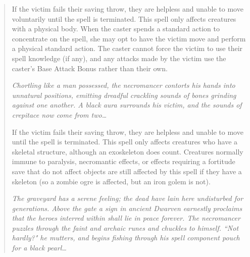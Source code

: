 \begin{quote}
If the victim fails their saving throw, they are helpless and unable to move voluntarily until the spell is terminated. This spell only affects creatures with a physical body. When the caster spends a standard action to concentrate on the spell, she may opt to have the victim move and perform a physical standard action. The caster cannot force the victim to use their spell knowledge (if any), and any attacks made by the victim use the caster's Base Attack Bonus rather than their own.\\

\begin{small}
\end{small}
\emph{Chortling like a man possessed, the necromancer contorts his hands into unnatural positions, emitting dreadful crackling sounds of bones grinding against one another. A black aura surrounds his victim, and the sounds of crepitace now come from two\ldots}

If the victim fails their saving throw, they are helpless and unable to move until the spell is terminated. This spell only affects creatures who have a skeletal structure, although an exoskeleton does count. Creatures normally immune to paralysis, necromantic effects, or effects requiring a fortitude save that do not affect objects are still affected by this spell if they have a skeleton (so a zombie ogre is affected, but an iron golem is not).\\

\begin{small}
\end{small}
\emph{The graveyard has a serene feeling; the dead have lain here undisturbed for generations. Above the gate a sign in ancient Dwarven earnestly proclaims that the heroes interred within shall lie in peace forever. The necromancer puzzles through the faint and archaic runes and chuckles to himself. ``Not hardly?" he mutters, and begins fishing through his spell component pouch for a black pearl\ldots}


\end{quote}
